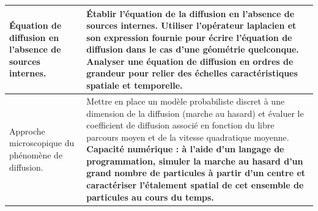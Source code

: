 {\begin{minipage}[t]{0.5\textwidth}
\begin{tabularx}{\textwidth}{|X|X|}
    Équation de diffusion en l'absence de sources internes. & Établir l'équation de la diffusion en l'absence de sources internes. Utiliser l'opérateur laplacien et son expression fournie pour écrire l'équation de diffusion dans le cas d'une géométrie quelconque. Analyser une équation de diffusion en ordres de grandeur pour relier des échelles caractéristiques spatiale et temporelle. \\
    \hline 
    Approche microscopique du phénomène de diffusion. & 
Mettre en place un modèle probabiliste discret à une dimension de la diffusion (marche au hasard) et évaluer le coefficient de diffusion associé en fonction du libre parcours moyen et de la vitesse quadratique moyenne.
\textbf{Capacité numérique : à l'aide d'un langage de programmation, simuler la marche au hasard d'un grand nombre de particules à partir d'un centre et caractériser l'étalement spatial de cet ensemble de particules au cours du temps.} \\
\hline
\end{tabularx}
\vfill
\end{minipage}
}

